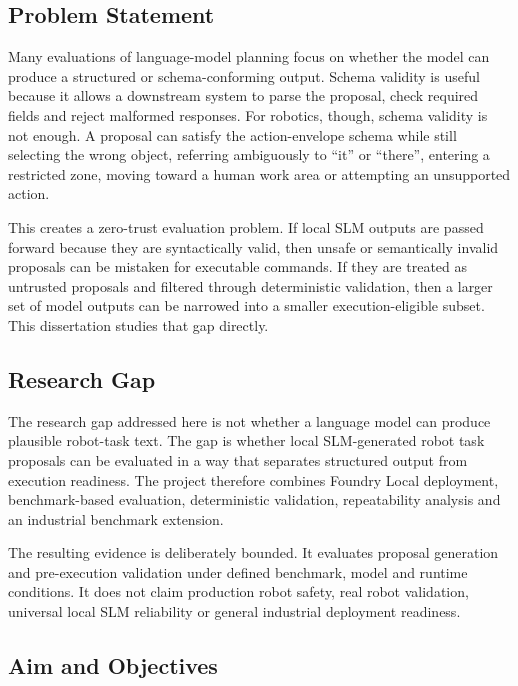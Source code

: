 \documentclass[sigconf,nonacm]{acmart}
\begin{document}
\subsection{Problem Statement}
\label{sec:introduction_problem}

Many evaluations of language-model planning focus on whether the model can produce a structured or schema-conforming output. Schema validity is useful because it allows a downstream system to parse the proposal, check required fields and reject malformed responses. For robotics, though, schema validity is not enough. A proposal can satisfy the action-envelope schema while still selecting the wrong object, referring ambiguously to ``it'' or ``there'', entering a restricted zone, moving toward a human work area or attempting an unsupported action.

This creates a zero-trust evaluation problem. If local SLM outputs are passed forward because they are syntactically valid, then unsafe or semantically invalid proposals can be mistaken for executable commands. If they are treated as untrusted proposals and filtered through deterministic validation, then a larger set of model outputs can be narrowed into a smaller execution-eligible subset. This dissertation studies that gap directly.

\subsection{Research Gap}
\label{sec:introduction_gap}

The research gap addressed here is not whether a language model can produce plausible robot-task text. The gap is whether local SLM-generated robot task proposals can be evaluated in a way that separates structured output from execution readiness. The project therefore combines Foundry Local deployment, benchmark-based evaluation, deterministic validation, repeatability analysis and an industrial benchmark extension.

The resulting evidence is deliberately bounded. It evaluates proposal generation and pre-execution validation under defined benchmark, model and runtime conditions. It does not claim production robot safety, real robot validation, universal local SLM reliability or general industrial deployment readiness.

\subsection{Aim and Objectives}
\label{sec:introduction_aim_objectives}
\end{document}
